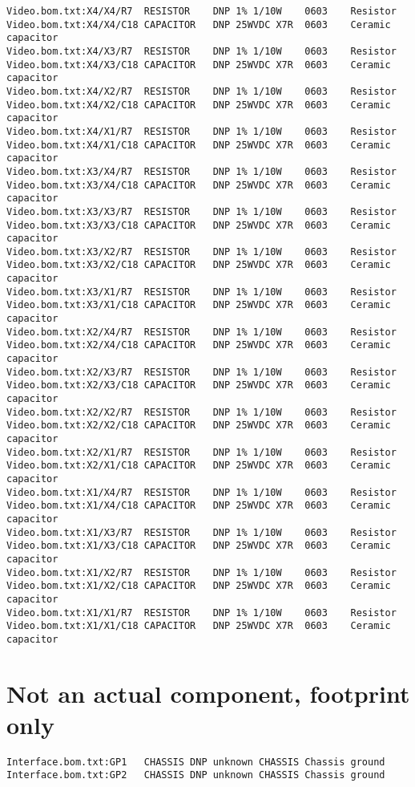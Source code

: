\documentclass[11pt]{article}
\begin{document}
\begin{verbatim}
Video.bom.txt:X4/X4/R7	RESISTOR	DNP	1% 1/10W	0603	Resistor	
Video.bom.txt:X4/X4/C18	CAPACITOR	DNP	25WVDC X7R	0603	Ceramic capacitor	
Video.bom.txt:X4/X3/R7	RESISTOR	DNP	1% 1/10W	0603	Resistor	
Video.bom.txt:X4/X3/C18	CAPACITOR	DNP	25WVDC X7R	0603	Ceramic capacitor	
Video.bom.txt:X4/X2/R7	RESISTOR	DNP	1% 1/10W	0603	Resistor	
Video.bom.txt:X4/X2/C18	CAPACITOR	DNP	25WVDC X7R	0603	Ceramic capacitor	
Video.bom.txt:X4/X1/R7	RESISTOR	DNP	1% 1/10W	0603	Resistor	
Video.bom.txt:X4/X1/C18	CAPACITOR	DNP	25WVDC X7R	0603	Ceramic capacitor	
Video.bom.txt:X3/X4/R7	RESISTOR	DNP	1% 1/10W	0603	Resistor	
Video.bom.txt:X3/X4/C18	CAPACITOR	DNP	25WVDC X7R	0603	Ceramic capacitor	
Video.bom.txt:X3/X3/R7	RESISTOR	DNP	1% 1/10W	0603	Resistor	
Video.bom.txt:X3/X3/C18	CAPACITOR	DNP	25WVDC X7R	0603	Ceramic capacitor	
Video.bom.txt:X3/X2/R7	RESISTOR	DNP	1% 1/10W	0603	Resistor	
Video.bom.txt:X3/X2/C18	CAPACITOR	DNP	25WVDC X7R	0603	Ceramic capacitor	
Video.bom.txt:X3/X1/R7	RESISTOR	DNP	1% 1/10W	0603	Resistor	
Video.bom.txt:X3/X1/C18	CAPACITOR	DNP	25WVDC X7R	0603	Ceramic capacitor	
Video.bom.txt:X2/X4/R7	RESISTOR	DNP	1% 1/10W	0603	Resistor	
Video.bom.txt:X2/X4/C18	CAPACITOR	DNP	25WVDC X7R	0603	Ceramic capacitor	
Video.bom.txt:X2/X3/R7	RESISTOR	DNP	1% 1/10W	0603	Resistor	
Video.bom.txt:X2/X3/C18	CAPACITOR	DNP	25WVDC X7R	0603	Ceramic capacitor	
Video.bom.txt:X2/X2/R7	RESISTOR	DNP	1% 1/10W	0603	Resistor	
Video.bom.txt:X2/X2/C18	CAPACITOR	DNP	25WVDC X7R	0603	Ceramic capacitor	
Video.bom.txt:X2/X1/R7	RESISTOR	DNP	1% 1/10W	0603	Resistor	
Video.bom.txt:X2/X1/C18	CAPACITOR	DNP	25WVDC X7R	0603	Ceramic capacitor	
Video.bom.txt:X1/X4/R7	RESISTOR	DNP	1% 1/10W	0603	Resistor	
Video.bom.txt:X1/X4/C18	CAPACITOR	DNP	25WVDC X7R	0603	Ceramic capacitor	
Video.bom.txt:X1/X3/R7	RESISTOR	DNP	1% 1/10W	0603	Resistor	
Video.bom.txt:X1/X3/C18	CAPACITOR	DNP	25WVDC X7R	0603	Ceramic capacitor	
Video.bom.txt:X1/X2/R7	RESISTOR	DNP	1% 1/10W	0603	Resistor	
Video.bom.txt:X1/X2/C18	CAPACITOR	DNP	25WVDC X7R	0603	Ceramic capacitor	
Video.bom.txt:X1/X1/R7	RESISTOR	DNP	1% 1/10W	0603	Resistor	
Video.bom.txt:X1/X1/C18	CAPACITOR	DNP	25WVDC X7R	0603	Ceramic capacitor	
\end{verbatim}

\section{Not an actual component, footprint only}

\begin{verbatim}
Interface.bom.txt:GP1	CHASSIS	DNP	unknown	CHASSIS	Chassis ground	
Interface.bom.txt:GP2	CHASSIS	DNP	unknown	CHASSIS	Chassis ground	
\end{verbatim}



 
\end{document}
